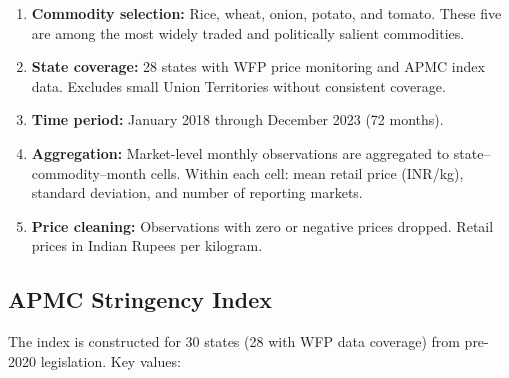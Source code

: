 \documentclass[12pt]{article}
\begin{document}
\begin{enumerate}
    \item \textbf{Commodity selection:} Rice, wheat, onion, potato, and tomato. These five are among the most widely traded and politically salient commodities.

    \item \textbf{State coverage:} 28 states with WFP price monitoring and APMC index data. Excludes small Union Territories without consistent coverage.

    \item \textbf{Time period:} January 2018 through December 2023 (72 months).

    \item \textbf{Aggregation:} Market-level monthly observations are aggregated to state--commodity--month cells. Within each cell: mean retail price (INR/kg), standard deviation, and number of reporting markets.

    \item \textbf{Price cleaning:} Observations with zero or negative prices dropped. Retail prices in Indian Rupees per kilogram.
\end{enumerate}

\subsection{APMC Stringency Index}

The index is constructed for 30 states (28 with WFP data coverage) from pre-2020 legislation. Key values:
\end{document}
